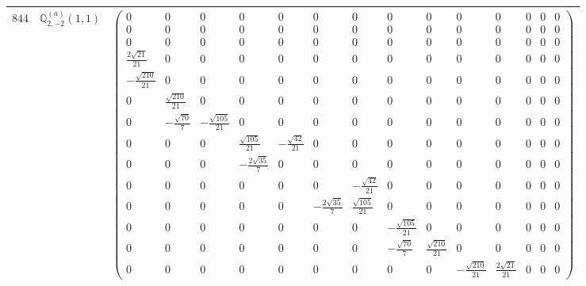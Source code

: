 \documentclass[fleqn,8pt,landscape]{jsarticle}
\begin{document}
\begin{center}
\begin{longtable}{ccc}
$ 844 $ & $ \mathbb{Q}_{2,-2}^{(a)}(1,1) $ & $ \begin{pmatrix} 0 & 0 & 0 & 0 & 0 & 0 & 0 & 0 & 0 & 0 & 0 & 0 & 0 & 0 \\ 0 & 0 & 0 & 0 & 0 & 0 & 0 & 0 & 0 & 0 & 0 & 0 & 0 & 0 \\ 0 & 0 & 0 & 0 & 0 & 0 & 0 & 0 & 0 & 0 & 0 & 0 & 0 & 0 \\ \frac{2 \sqrt{21}}{21} & 0 & 0 & 0 & 0 & 0 & 0 & 0 & 0 & 0 & 0 & 0 & 0 & 0 \\ - \frac{\sqrt{210}}{21} & 0 & 0 & 0 & 0 & 0 & 0 & 0 & 0 & 0 & 0 & 0 & 0 & 0 \\ 0 & \frac{\sqrt{210}}{21} & 0 & 0 & 0 & 0 & 0 & 0 & 0 & 0 & 0 & 0 & 0 & 0 \\ 0 & - \frac{\sqrt{70}}{7} & - \frac{\sqrt{105}}{21} & 0 & 0 & 0 & 0 & 0 & 0 & 0 & 0 & 0 & 0 & 0 \\ 0 & 0 & 0 & \frac{\sqrt{105}}{21} & - \frac{\sqrt{42}}{21} & 0 & 0 & 0 & 0 & 0 & 0 & 0 & 0 & 0 \\ 0 & 0 & 0 & - \frac{2 \sqrt{35}}{7} & 0 & 0 & 0 & 0 & 0 & 0 & 0 & 0 & 0 & 0 \\ 0 & 0 & 0 & 0 & 0 & 0 & - \frac{\sqrt{42}}{21} & 0 & 0 & 0 & 0 & 0 & 0 & 0 \\ 0 & 0 & 0 & 0 & 0 & - \frac{2 \sqrt{35}}{7} & \frac{\sqrt{105}}{21} & 0 & 0 & 0 & 0 & 0 & 0 & 0 \\ 0 & 0 & 0 & 0 & 0 & 0 & 0 & - \frac{\sqrt{105}}{21} & 0 & 0 & 0 & 0 & 0 & 0 \\ 0 & 0 & 0 & 0 & 0 & 0 & 0 & - \frac{\sqrt{70}}{7} & \frac{\sqrt{210}}{21} & 0 & 0 & 0 & 0 & 0 \\ 0 & 0 & 0 & 0 & 0 & 0 & 0 & 0 & 0 & - \frac{\sqrt{210}}{21} & \frac{2 \sqrt{21}}{21} & 0 & 0 & 0 \end{pmatrix} $ \\ \hline

\end{longtable}
\end{center}
\end{document}
